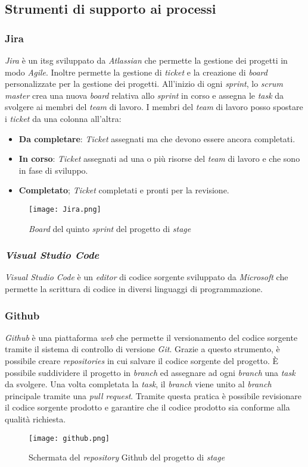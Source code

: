 \subsection{Strumenti di supporto ai processi}
\subsubsection{Jira}
\textit{Jira} è un \gls{itsg} sviluppato da \textit{Atlassian} che permette la gestione dei progetti in modo \textit{Agile}. Inoltre permette la gestione di \textit{ticket} e la creazione di \textit{board} personalizzate per la gestione dei progetti.
All'inizio di ogni \textit{sprint}, lo \textit{scrum master} crea una nuova \textit{board} relativa allo \textit{sprint} in corso e assegna le \textit{task} da svolgere ai membri del \textit{team} di lavoro.
I membri del \textit{team} di lavoro posso spostare i \textit{ticket} da una colonna all'altra: 
\begin{itemize}
    \item \textbf{Da completare}: \textit{Ticket} assegnati ma che devono essere ancora completati.
    \item \textbf{In corso}: \textit{Ticket} assegnati ad una o più risorse del \textit{team} di lavoro e che sono in fase di sviluppo.
    \item \textbf{Completato}; \textit{Ticket} completati e pronti per la revisione.
\end{itemize}
\begin{figure}[H]
    \centering
    \texttt{[image: Jira.png]}
    \caption{\textit{Board} del quinto \textit{sprint} del progetto di \textit{stage}}
    \label{fig:Jira}
\end{figure}

\subsubsection{\textit{Visual Studio Code}}
\textit{Visual Studio Code} è un \textit{editor} di codice sorgente sviluppato da \textit{Microsoft} che permette la scrittura di codice in diversi linguaggi di programmazione.

\subsubsection{Github}
\textit{Github} è una piattaforma \textit{web} che permette il versionamento del codice sorgente tramite il sistema di controllo di versione \textit{Git}. 
Grazie a questo strumento, è possibile creare \textit{repositories} in cui salvare il codice sorgente del progetto. 
È possibile suddividere il progetto in \textit{branch} ed assegnare ad ogni \textit{branch} una \textit{task} da svolgere. Una volta completata la \textit{task}, il \textit{branch} viene unito al \textit{branch} principale tramite una \textit{pull request}. 
Tramite questa pratica è possibile revisionare il codice sorgente prodotto e garantire che il codice prodotto sia conforme alla qualità richiesta.
\begin{figure}[H]
    \centering
    \texttt{[image: github.png]}
    \caption{Schermata del \textit{repository} Github del progetto di \textit{stage}}
    \label{fig:Github}
\end{figure}
